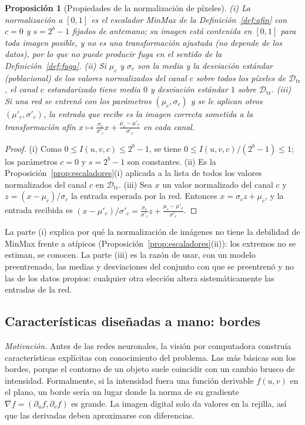 \documentclass[11pt]{article}
\newtheorem{proposicion}[teorema]{Proposición}
\theoremstyle{definition}
\theoremstyle{remark}
\newcommand{\Dtr}{\mathcal{D}_{\mathrm{tr}}}
\begin{document}
\begin{proposicion}[Propiedades de la normalización de píxeles]\label{prop:norm-pix}
\noindent (i) La normalización a $[0,1]$ es el escalador MinMax de la Definición~\ref{def:afin} con $c=0$ y $s=2^b-1$ fijados de antemano; su imagen está contenida en $[0,1]$ para toda imagen posible, y no es una transformación ajustada (no depende de los datos), por lo que no puede producir fuga en el sentido de la Definición~\ref{def:fuga}. (ii) Si $\mu_c$ y $\sigma_c$ son la media y la desviación estándar (poblacional) de los valores normalizados del canal $c$ sobre todos los píxeles de $\Dtr$, el canal $c$ estandarizado tiene media $0$ y desviación estándar $1$ sobre $\Dtr$. (iii) Si una red se entrenó con los parámetros $(\mu_c,\sigma_c)$ y se le aplican otros $(\mu'_c,\sigma'_c)$, la entrada que recibe es la imagen correcta sometida a la transformación afín $x\mapsto\frac{\sigma_c}{\sigma'_c}x+\frac{\mu_c-\mu'_c}{\sigma'_c}$ en cada canal.
\end{proposicion}
\begin{proof}
\noindent (i) Como $0\le I(u,v,c)\le2^b-1$, se tiene $0\le I(u,v,c)/(2^b-1)\le1$; los parámetros $c=0$ y $s=2^b-1$ son constantes. (ii) Es la Proposición~\ref{prop:escaladores}(i) aplicada a la lista de todos los valores normalizados del canal $c$ en $\Dtr$. (iii) Sea $x$ un valor normalizado del canal $c$ y $z=(x-\mu_c)/\sigma_c$ la entrada esperada por la red. Entonces $x=\sigma_cz+\mu_c$, y la entrada recibida es $(x-\mu'_c)/\sigma'_c=\frac{\sigma_c}{\sigma'_c}z+\frac{\mu_c-\mu'_c}{\sigma'_c}$.
\end{proof}

\noindent La parte (i) explica por qué la normalización de imágenes no tiene la debilidad de MinMax frente a atípicos (Proposición~\ref{prop:escaladores}(ii)): los extremos no se estiman, se conocen. La parte (iii) es la razón de usar, con un modelo preentrenado, las medias y desviaciones del conjunto con que se preentrenó y no las de los datos propios: cualquier otra elección altera sistemáticamente las entradas de la red.

\subsection{Características diseñadas a mano: bordes}\label{sec:bordes}

\noindent \emph{Motivación.} Antes de las redes neuronales, la visión por computadora construía características explícitas con conocimiento del problema. Las más básicas son los bordes, porque el contorno de un objeto suele coincidir con un cambio brusco de intensidad. Formalmente, si la intensidad fuera una función derivable $f(u,v)$ en el plano, un borde sería un lugar donde la norma de su gradiente $\nabla f=(\partial_uf,\partial_vf)$ es grande. La imagen digital solo da valores en la rejilla, así que las derivadas deben aproximarse con diferencias.
\end{document}
